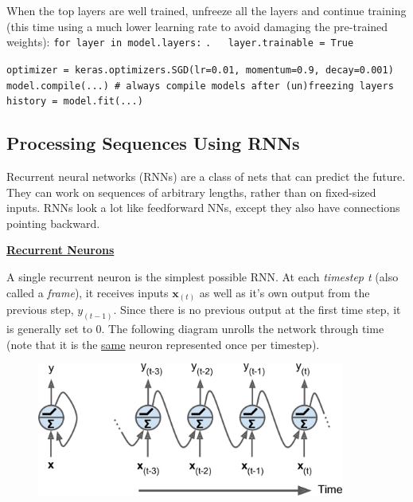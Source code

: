 When the top layers are well trained, unfreeze all the layers and continue training\newline
(this time using a much lower learning rate to avoid damaging the pre-trained weights):\newline
\texttt{for layer in model.layers:}\newline
\texttt{.~~~layer.trainable = True}

\texttt{optimizer = keras.optimizers.SGD(lr=0.01, momentum=0.9, decay=0.001)}\newline
\texttt{model.compile(...) \# always compile models after (un)freezing layers}\newline
\texttt{history = model.fit(...)}\newline

\subsection{Processing Sequences Using RNNs}

Recurrent neural networks (RNNs) are a class of nets that can predict the future.\newline
They can work on sequences of arbitrary lengths, rather than on fixed-sized inputs.\newline
RNNs look a lot like feedforward NNs,
except they also have connections pointing backward.\newline

\textbf{\underline{Recurrent Neurons}}

A single recurrent neuron is the simplest possible RNN.
At each \textit{timestep t} (also called a \textit{frame}),
it receives inputs $\boldsymbol{x}_{(t)}$ as well as it's own output from the previous step, $y_{(t-1)}$.
Since there is no previous output at the first time step, it is generally set to 0.
The following diagram unrolls the network through time (note that it is the \underline{same} neuron represented once per timestep).\newline

\begin{figure}[ht]
\centering
\includegraphics[width=0.90\textwidth]{./images/recurrent_neuron.png}
\end{figure}

